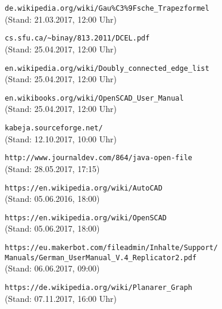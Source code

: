 \begin{thebibliography}{9}
		\verb|de.wikipedia.org/wiki/Gau%C3%9Fsche_Trapezformel| \\ (Stand: 21.03.2017, 12:00 Uhr)
		
		 \verb|cs.sfu.ca/~binay/813.2011/DCEL.pdf| \\ (Stand: 25.04.2017, 12:00 Uhr)

		 \verb|en.wikipedia.org/wiki/Doubly_connected_edge_list| \\ (Stand: 25.04.2017, 12:00 Uhr)
		
		 \verb|en.wikibooks.org/wiki/OpenSCAD_User_Manual| \\ (Stand: 25.04.2017, 12:00 Uhr)
		
		 \verb|kabeja.sourceforge.net/| \\ (Stand: 12.10.2017, 10:00 Uhr)
		
		 \verb|http://www.journaldev.com/864/java-open-file| \\ (Stand: 28.05.2017, 17:15)
		 
		 \verb|https://en.wikipedia.org/wiki/AutoCAD| \\ (Stand: 05.06.2016, 18:00)
		 
		 \verb|https://en.wikipedia.org/wiki/OpenSCAD| \\ (Stand: 05.06.2017, 18:00)
		 
		\verb|https://eu.makerbot.com/fileadmin/Inhalte/Support/| \\
		\tab \verb|Manuals/German_UserManual_V.4_Replicator2.pdf| \\ (Stand: 06.06.2017, 09:00)
	
		\verb|https://de.wikipedia.org/wiki/Planarer_Graph| \\ (Stand: 07.11.2017, 16:00 Uhr)
	
\end{thebibliography}